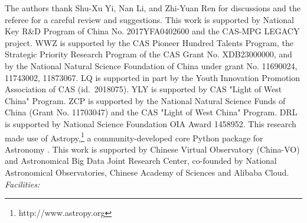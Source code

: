 \documentclass[iop,apj,numberedappendix,appendixfloats]{emulateapj}
\begin{document}




\acknowledgements
The authors thank Shu-Xu Yi, Nan Li, and Zhi-Yuan Ren for discussions and the referee for a careful review and suggestions.
This work is supported by National Key R\&D Program of China No.
2017YFA0402600 and the CAS-MPG LEGACY project. 
WWZ is supported by the CAS Pioneer Hundred Talents
Program, the Strategic Priority Research Program of the CAS Grant No. XDB23000000, and by the National Natural Science Foundation
of China under grant No. 11690024, 11743002, 11873067. 
LQ is supported in part by the Youth Innovation Promotion Association of CAS
(id.~2018075).
YLY is supported by CAS "Light of West China" Program.
ZCP is supported by the National Natural Science Funds of China (Grant No.
11703047) and the CAS "Light of West China" Program.
DRL is supported by National Science Foundation OIA Award 1458952.
This research made use of Astropy,\footnote{http://www.astropy.org} a community-developed core Python package for Astronomy \citep{astropy:2013, astropy:2018}. 
This work is supported by Chinese Virtual Observatory (China-VO) and Astronomical Big Data Joint Research Center, co-founded by National Astronomical Observatories, Chinese Academy of Sciences and Alibaba Cloud.
{\it Facilities:}


%

%

\end{document}
